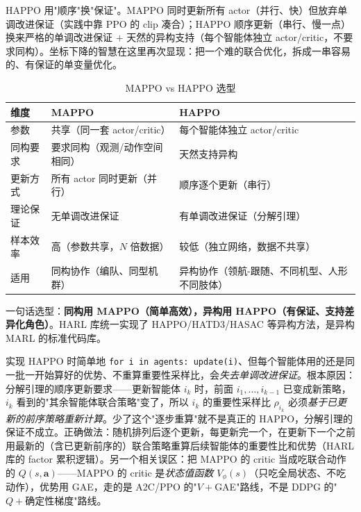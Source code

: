 \begin{insight}
HAPPO 用"顺序"换"保证"。MAPPO 同时更新所有 actor（并行、快）但放弃单调改进保证（实践中靠 PPO 的 clip 凑合）；HAPPO 顺序更新（串行、慢一点）换来严格的单调改进保证 $+$ 天然的异构支持（每个智能体独立 actor/critic，不要求同构）。坐标下降的智慧在这里再次显现：把一个难的联合优化，拆成一串容易的、有保证的单变量优化。
\end{insight}

\begin{table}[H]\centering\small
\caption{MAPPO vs HAPPO 选型}
\label{tab:sm-mappo-happo}
\begin{tabular}{p{} p{} p{}}
\toprule
维度 & MAPPO & HAPPO \\
\midrule
参数 & 共享（同一套 actor/critic） & 每个智能体独立 actor/critic \\
同构要求 & 要求同构（观测/动作空间相同） & 天然支持异构 \\
更新方式 & 所有 actor 同时更新（并行） & 顺序逐个更新（串行） \\
理论保证 & 无单调改进保证 & 有单调改进保证（分解引理） \\
样本效率 & 高（参数共享，$N$ 倍数据） & 较低（独立网络，数据不共享） \\
适用 & 同构协作（编队、同型机群） & 异构协作（领航-跟随、不同机型、人形不同肢体） \\
\bottomrule
\end{tabular}
\end{table}
一句话选型：\textbf{同构用 MAPPO（简单高效），异构用 HAPPO（有保证、支持差异化角色）}。HARL 库\cite{zhong2024harl}统一实现了 HAPPO/HATD3/HASAC 等异构方法，是异构 MARL 的标准代码库。

\begin{pitfall}
实现 HAPPO 时简单地 \texttt{for i in agents: update(i)}、但每个智能体用的还是同一批一开始算好的优势、不重算重要性采样比，会\emph{失去单调改进保证}。根本原因：分解引理的顺序更新要求——更新智能体 $i_k$ 时，前面 $i_1,\dots,i_{k-1}$ 已变成新策略，$i_k$ 看到的"其余智能体联合策略"变了，所以 $i_k$ 的重要性采样比 $\rho_{i_k}$ 必须\emph{基于已更新的前序策略重新计算}。少了这个"逐步重算"就不是真正的 HAPPO，分解引理的保证不成立。正确做法：随机排列后逐个更新，每更新完一个，在更新下一个之前用最新的（含已更新前序的）联合策略重算后续智能体的重要性比和优势（HARL 库的 factor 累积逻辑）。另一个相关误区：把 MAPPO 的 critic 当成吃联合动作的 $Q(s,\mathbf{a})$——MAPPO 的 critic 是\emph{状态值函数 $V_\phi(s)$}（只吃全局状态、不吃动作），优势用 GAE，走的是 A2C/PPO 的"$V+$GAE"路线，不是 DDPG 的"$Q+$确定性梯度"路线。
\end{pitfall}

